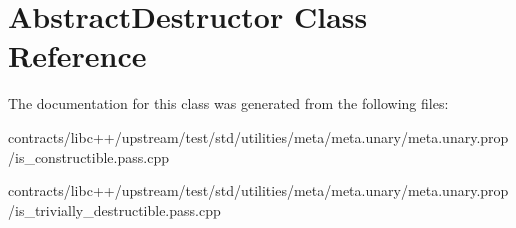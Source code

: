 \hypertarget{class_abstract_destructor}{}\section{Abstract\+Destructor Class Reference}
\label{class_abstract_destructor}


The documentation for this class was generated from the following files\+:\begin{DoxyCompactItemize}
\item 
contracts/libc++/upstream/test/std/utilities/meta/meta.\+unary/meta.\+unary.\+prop/is\+\_\+constructible.\+pass.\+cpp\item 
contracts/libc++/upstream/test/std/utilities/meta/meta.\+unary/meta.\+unary.\+prop/is\+\_\+trivially\+\_\+destructible.\+pass.\+cpp\end{DoxyCompactItemize}
